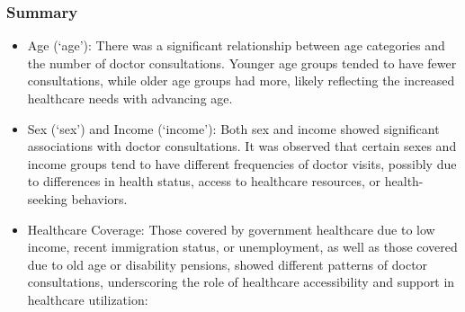 \documentclass[
]{article}
\begin{document}
\subsubsection{Summary}\label{summary}

\begin{itemize}
\item
  Age (`age'): There was a significant relationship between age
  categories and the number of doctor consultations. Younger age groups
  tended to have fewer consultations, while older age groups had more,
  likely reflecting the increased healthcare needs with advancing age.
\item
  Sex (`sex') and Income (`income'): Both sex and income showed
  significant associations with doctor consultations. It was observed
  that certain sexes and income groups tend to have different
  frequencies of doctor visits, possibly due to differences in health
  status, access to healthcare resources, or health-seeking behaviors.
\item
  Healthcare Coverage: Those covered by government healthcare due to low
  income, recent immigration status, or unemployment, as well as those
  covered due to old age or disability pensions, showed different
  patterns of doctor consultations, underscoring the role of healthcare
  accessibility and support in healthcare utilization:


\end{itemize}
\end{document}
